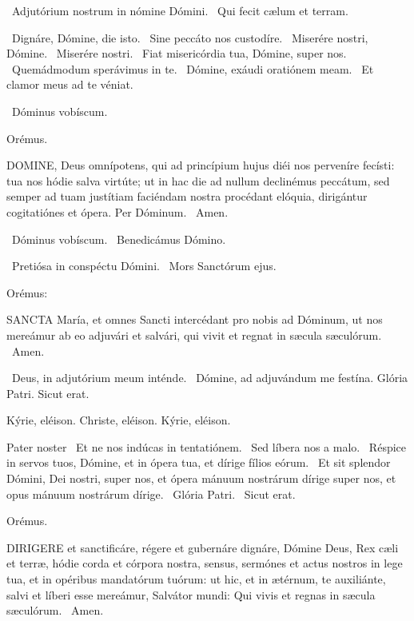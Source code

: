 
\V\ Adjutórium nostrum in nómine Dómini. \R\ Qui fecit cælum et terram.


\V\ Dignáre, Dómine, die isto. \R\ Sine peccáto nos custodíre. \V\ Miserére nostri, Dómine. \R\ Miserére nostri. \V\ Fiat misericórdia tua, Dómine, super nos. \R\ Quemádmodum sperávimus in te. \V\ Dómine, exáudi oratiónem meam. \R\ Et clamor meus ad te véniat.

\V\ Dóminus vobíscum.

Orémus. 

\lettrine[lines=2]{D}{OMINE}, Deus omnípotens, qui ad princípium hujus diéi nos perveníre fecísti: tua nos hódie salva virtúte; ut in hac die ad nullum declinémus peccátum, sed semper ad tuam justítiam faciéndam nostra procédant elóquia, dirigántur cogitatiónes et ópera. Per Dóminum. \R\ Amen.

\V\ Dóminus vobíscum. \V\ Benedicámus Dómino.


\V\ Pretiósa in conspéctu Dómini. \R\ Mors Sanctórum ejus.

 Orémus:


\lettrine[lines=2]{S}{ANCTA} María, et omnes Sancti intercédant pro nobis ad Dóminum, ut nos mereámur ab eo adjuvári et salvári, qui vivit et regnat in sæcula sæculórum. \R\ Amen.

\V\ Deus, in adjutórium meum inténde. \R\ Dómine, ad adjuvándum me festína.  Glória Patri. Sicut erat.

Kýrie, eléison. Christe, eléison. Kýrie, eléison.

Pater noster  \V\ Et ne nos indúcas in tentatiónem. \R\ Sed líbera nos a malo. \V\ Réspice in servos tuos, Dómine, et in ópera tua, et dírige fílios eórum. \R\ Et sit splendor Dómini, Dei nostri, super nos, et ópera mánuum nostrárum dírige super nos, et opus mánuum nostrárum dírige. \V\ Glória Patri. \R\ Sicut erat.

Orémus. 

\lettrine[lines=2]{D}{IRIGERE} et sanctificáre, régere et gubernáre dignáre, Dómine Deus, Rex cæli et terræ, hódie corda et córpora nostra, sensus, sermónes et actus nostros in lege tua, et in opéribus mandatórum tuórum: ut hic, et in ætérnum, te auxiliánte, salvi et líberi esse mereámur, Salvátor mundi: Qui vivis et regnas in sæcula sæculórum. \R\ Amen.

